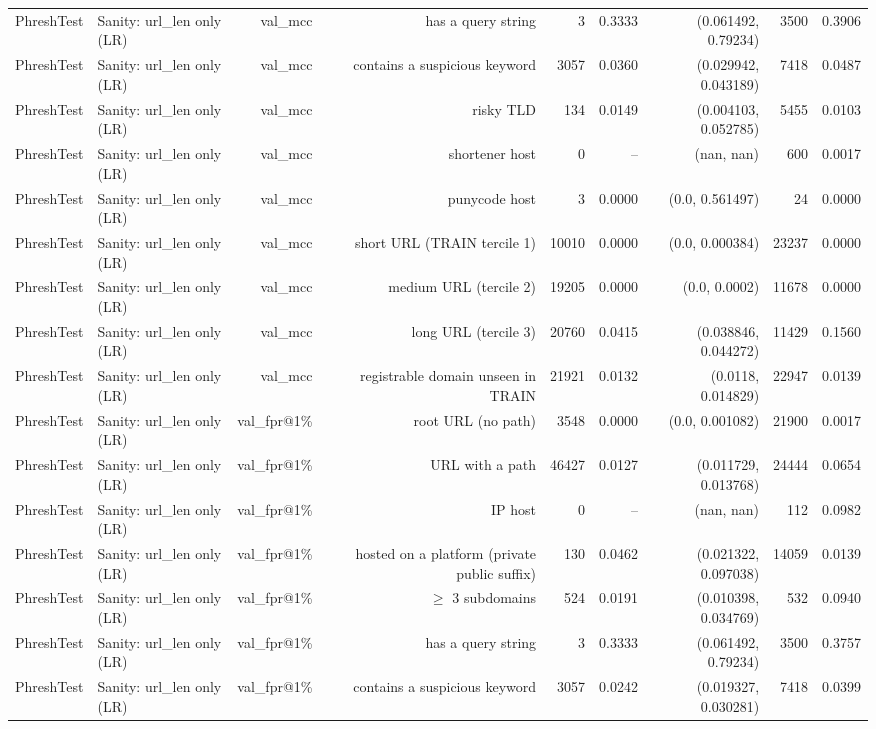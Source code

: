 \begin{table}[t]
\begin{tabular}{llrrrrrrr}
PhreshTest & Sanity: url\_len only (LR) & val\_mcc & has a query string & 3 & 0.3333 & (0.061492, 0.79234) & 3500 & 0.3906 \\
PhreshTest & Sanity: url\_len only (LR) & val\_mcc & contains a suspicious keyword & 3057 & 0.0360 & (0.029942, 0.043189) & 7418 & 0.0487 \\
PhreshTest & Sanity: url\_len only (LR) & val\_mcc & risky TLD & 134 & 0.0149 & (0.004103, 0.052785) & 5455 & 0.0103 \\
PhreshTest & Sanity: url\_len only (LR) & val\_mcc & shortener host & 0 & -- & (nan, nan) & 600 & 0.0017 \\
PhreshTest & Sanity: url\_len only (LR) & val\_mcc & punycode host & 3 & 0.0000 & (0.0, 0.561497) & 24 & 0.0000 \\
PhreshTest & Sanity: url\_len only (LR) & val\_mcc & short URL (TRAIN tercile 1) & 10010 & 0.0000 & (0.0, 0.000384) & 23237 & 0.0000 \\
PhreshTest & Sanity: url\_len only (LR) & val\_mcc & medium URL (tercile 2) & 19205 & 0.0000 & (0.0, 0.0002) & 11678 & 0.0000 \\
PhreshTest & Sanity: url\_len only (LR) & val\_mcc & long URL (tercile 3) & 20760 & 0.0415 & (0.038846, 0.044272) & 11429 & 0.1560 \\
PhreshTest & Sanity: url\_len only (LR) & val\_mcc & registrable domain unseen in TRAIN & 21921 & 0.0132 & (0.0118, 0.014829) & 22947 & 0.0139 \\
PhreshTest & Sanity: url\_len only (LR) & val\_fpr@1\% & root URL (no path) & 3548 & 0.0000 & (0.0, 0.001082) & 21900 & 0.0017 \\
PhreshTest & Sanity: url\_len only (LR) & val\_fpr@1\% & URL with a path & 46427 & 0.0127 & (0.011729, 0.013768) & 24444 & 0.0654 \\
PhreshTest & Sanity: url\_len only (LR) & val\_fpr@1\% & IP host & 0 & -- & (nan, nan) & 112 & 0.0982 \\
PhreshTest & Sanity: url\_len only (LR) & val\_fpr@1\% & hosted on a platform (private public suffix) & 130 & 0.0462 & (0.021322, 0.097038) & 14059 & 0.0139 \\
PhreshTest & Sanity: url\_len only (LR) & val\_fpr@1\% & $\geq$ 3 subdomains & 524 & 0.0191 & (0.010398, 0.034769) & 532 & 0.0940 \\
PhreshTest & Sanity: url\_len only (LR) & val\_fpr@1\% & has a query string & 3 & 0.3333 & (0.061492, 0.79234) & 3500 & 0.3757 \\
PhreshTest & Sanity: url\_len only (LR) & val\_fpr@1\% & contains a suspicious keyword & 3057 & 0.0242 & (0.019327, 0.030281) & 7418 & 0.0399 \\

\end{tabular}
\end{table}
